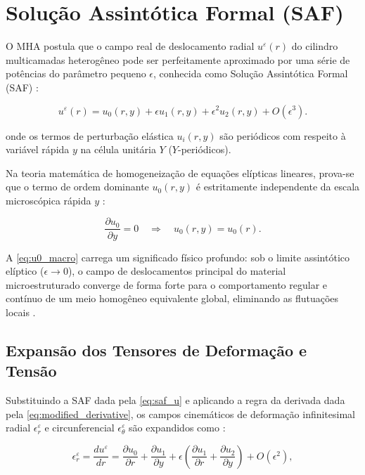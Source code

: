 \section{Solução Assintótica Formal (SAF)}

O MHA postula que o campo real de deslocamento radial $u^\varepsilon(r)$ do cilindro multicamadas heterogêneo pode ser perfeitamente aproximado por uma série de potências do parâmetro pequeno $\epsilon$, conhecida como Solução Assintótica Formal (SAF) \cite{bakhvalov1989}:

\begin{equation}
  u^\varepsilon (r) = u_0(r, y) + \epsilon u_1(r, y) + \epsilon^2 u_2(r, y) + O(\epsilon^3).
  \label{eq:saf_u}
\end{equation}

onde os termos de perturbação elástica $u_i (r, y)$ são periódicos com respeito à variável rápida $y$ na célula unitária $Y$ ($Y$-periódicos).

Na teoria matemática de homogeneização de equações elípticas lineares, prova-se que o termo de ordem dominante $u_0(r, y)$ é estritamente independente da escala microscópica rápida $y$ \cite{bakhvalov1989}:

\begin{equation}
  \frac{\partial u_0}{\partial y} = 0 \quad \Longrightarrow \quad u_0(r, y) = u_0(r).
  \label{eq:u0_macro}
\end{equation}

A \eqref{eq:u0_macro} carrega um significado físico profundo: sob o limite assintótico elíptico ($\epsilon \to 0$), o campo de deslocamentos principal do material microestruturado converge de forma forte para o comportamento regular e contínuo de um meio homogêneo equivalente global, eliminando as flutuações locais \cite{bakhvalov1989}.

\subsection{Expansão dos Tensores de Deformação e Tensão}

Substituindo a SAF dada pela \eqref{eq:saf_u} e aplicando a regra da derivada dada pela \eqref{eq:modified_derivative}, os campos cinemáticos de deformação infinitesimal radial $\epsilon_r^\varepsilon$ e circunferencial $\epsilon_\theta^\varepsilon$ são expandidos como \cite{bakhvalov1989}:

\begin{equation}
  \epsilon_r^\varepsilon = \frac{d u^\varepsilon}{d r} = \frac{\partial u_0}{\partial r} + \frac{\partial u_1}{\partial y} + \epsilon \left( \frac{\partial u_1}{\partial r} + \frac{\partial u_2}{\partial y} \right) + O(\epsilon^2),
  \label{eq:deform_r}
\end{equation}

